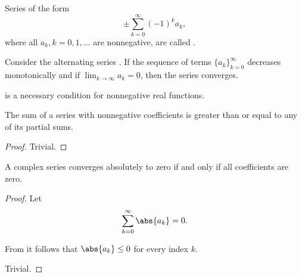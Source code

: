 \begin{definition}\label{def:alternating_series}
  Series of the form
  \begin{equation}\label{def:alternating_series/series}
    \pm \sum_{k=0}^\infty (-1)^k a_k,
  \end{equation}
  where all \( a_k, k = 0, 1, \ldots \) are nonnegative, are called .
\end{definition}

\begin{proposition}\label{thm:leibniz_alternating_series_test}
  Consider the alternating series . If the sequence of terms \( \{ a_k \}_{k=0}^\infty \) decreases monotonically and if \( \lim_{k \to \infty} a_k = 0 \), then the series converges.
\end{proposition}

\begin{theorem}\label{thm:weierstrass_series_criterion_nessessity}
   is a necessary condition for nonnegative real functions.
\end{theorem}

\begin{proposition}\label{thm:nonnegative_series_inequality}
  The sum of a series with nonnegative coefficients is greater than or equal to any of its partial sums.
\end{proposition}
\begin{proof}
  Trivial.
\end{proof}

\begin{corollary}\label{thm:absolute_convergence_to_zero}
  A complex series converges absolutely to zero if and only if all coefficients are zero.
\end{corollary}
\begin{proof}
  \SufficiencySubProof Let
  \begin{equation*}
    \sum_{k=0}^\infty \abs{a_k} = 0.
  \end{equation*}

  From  it follows that \( \abs{a_k} \leq 0 \) for every index \( k \).

  \NecessitySubProof Trivial.
\end{proof}
